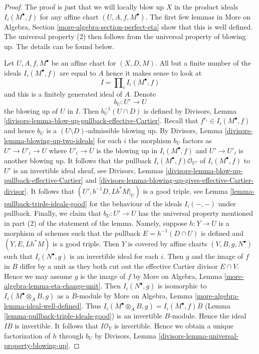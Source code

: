 \begin{proof}
The proof is just that we will locally blow up $X$ in the product ideals
$I_i(M^\bullet, f)$ for any affine chart $(U, A, f, M^\bullet)$.
The first few lemmas in More on Algebra, Section
\ref{more-algebra-section-perfect-eta} show that this is well defined.
The universal property (2) then follows from the
universal property of blowing up.
The details can be found below.

\medskip\noindent
Let $U, A, f, M^\bullet$ be an affine chart for $(X, D, M)$.
All but a finite number of the ideals $I_i(M^\bullet, f)$ are
equal to $A$ hence it makes sense to look at
$$
I = \prod\nolimits_i I_i(M^\bullet, f)
$$
and this is a finitely generated ideal of $A$. Denote
$$
b_U : U' \to U
$$
the blowing up of $U$ in $I$. Then $b_U^{-1}(U \cap D)$ is defined by
Divisors, Lemma
\ref{divisors-lemma-blow-up-pullback-effective-Cartier}.
Recall that $f^{r_i} \in I_i(M^\bullet, f)$ and hence
$b_U$ is a $(U \setminus D)$-admissible blowing up.
By Divisors, Lemma \ref{divisors-lemma-blowing-up-two-ideals}
for each $i$ the morphism $b_U$ factors as $U' \to U'_i \to U$
where $U'_i \to U$ is the blowing up in $I_i(M^\bullet, f)$
and $U' \to U'_i$ is another blowing up. It follows that
the pullback $I_i(M^\bullet, f)\mathcal{O}_{U'}$
of $I_i(M^\bullet, f)$ to $U'$ is an invertible ideal sheaf, see
Divisors, Lemmas \ref{divisors-lemma-blow-up-pullback-effective-Cartier} and
\ref{divisors-lemma-blowing-up-gives-effective-Cartier-divisor}.
It follows that $(U', b^{-1}D, Lb^*M|_U)$ is a good triple, see
Lemma \ref{lemma-pullback-triple-ideals-good}
for the behaviour of the ideals $I_i(-,-)$ under pullback.
Finally, we claim that $b_U : U' \to U$ has the universal property
mentioned in part (2) of the statement of the lemma. Namely, suppose
$h : Y \to U$ is a morphism of schemes such that
the pullback $E = h^{-1}(D \cap U)$ is defined and $(Y, E, Lh^*M)$
is a good triple. Then $Y$ is covered by affine charts
$(V, B, g, N^\bullet)$ such that $I_i(N^\bullet, g)$ is
an invertible ideal for each $i$. Then $g$ and the image of
$f$ in $B$ differ by a unit as they both cut out the effective
Cartier divisor $E \cap V$. Hence we may assume $g$ is the image of $f$ by
More on Algebra, Lemma \ref{more-algebra-lemma-eta-change-unit}.
Then $I_i(N^\bullet, g)$ is isomorphic to $I_i(M^\bullet \otimes_A B, g)$
as a $B$-module by More on Algebra, Lemma
\ref{more-algebra-lemma-ideal-well-defined}.
Thus $I_i(M^\bullet \otimes_A B, g) = I_i(M^\bullet, f)B$
(Lemma \ref{lemma-pullback-triple-ideals-good})
is an invertible $B$-module.
Hence the ideal $IB$ is invertible. It follows that $I\mathcal{O}_Y$
is invertible. Hence we obtain a unique factorization of $h$ through
$b_U$ by Divisors, Lemma \ref{divisors-lemma-universal-property-blowing-up}.


\end{proof}
